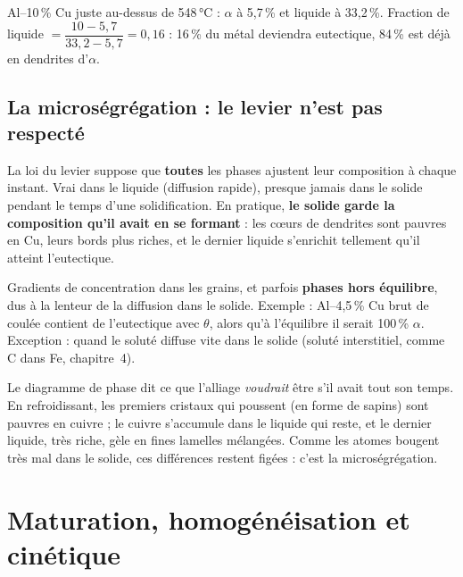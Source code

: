 \begin{exbox}[title={Exemple chiffré (pas dans les diapositives)}]
Al--10\,\% Cu juste au-dessus de 548\,°C : $\alpha$ à 5,7\,\% et liquide à 33,2\,\%.
Fraction de liquide $= \dfrac{10 - 5{,}7}{33{,}2 - 5{,}7} = 0{,}16$ : 16\,\% du métal deviendra
eutectique, 84\,\% est déjà en dendrites d'$\alpha$.
\end{exbox}

\subsection*{La microségrégation : le levier n'est pas respecté}

La loi du levier suppose que \textbf{toutes} les phases ajustent leur composition à chaque
instant. Vrai dans le liquide (diffusion rapide), presque jamais dans le solide pendant le temps
d'une solidification. En pratique, \textbf{le solide garde la composition qu'il avait en se
formant} : les c\oe urs de dendrites sont pauvres en Cu, leurs bords plus riches, et le dernier
liquide s'enrichit tellement qu'il atteint l'eutectique.


\begin{defnbox}[title={Microségrégation (ségrégation mineure)}]
Gradients de concentration dans les grains, et parfois \textbf{phases hors équilibre}, dus à
la lenteur de la diffusion dans le solide. Exemple : Al--4,5\,\% Cu brut de coulée contient de
l'eutectique avec $\theta$, alors qu'à l'équilibre il serait 100\,\% $\alpha$. Exception :
quand le soluté diffuse vite dans le solide (soluté interstitiel, comme C dans Fe, chapitre~4).
\end{defnbox}

\begin{goatbox}
Le diagramme de phase dit ce que l'alliage \emph{voudrait} être s'il avait tout son temps. En
refroidissant, les premiers cristaux qui poussent (en forme de sapins) sont pauvres en cuivre ;
le cuivre s'accumule dans le liquide qui reste, et le dernier liquide, très riche, gèle en
fines lamelles mélangées. Comme les atomes bougent très mal dans le solide, ces différences
restent figées : c'est la microségrégation.
\end{goatbox}

\section{Maturation, homogénéisation et cinétique}

